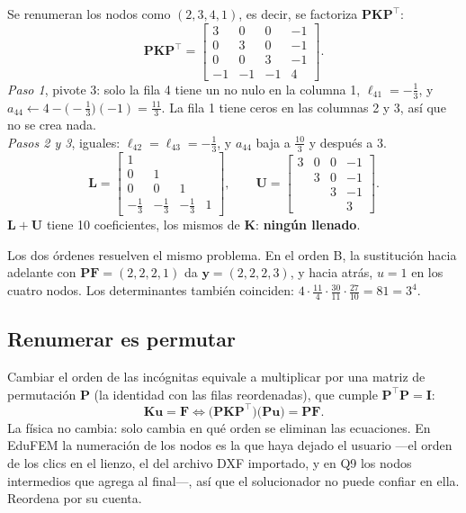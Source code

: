 \documentclass[11pt,a4paper]{article}
\newcommand{\cod}[1]{\texttt{\detokenize{#1}}}
\newcommand{\T}{^{\top}}
\newcommand{\mK}{\bm{K}}
\newcommand{\tf}[2]{\tfrac{#1}{#2}}
\begin{document}
\begin{paso}[title={Orden B: el nodo central al final}]
Se renumeran los nodos como $(2,3,4,1)$, es decir, se factoriza $\bm{P}\mK\bm{P}\T$:
\[
\bm{P}\mK\bm{P}\T=\begin{bmatrix}3&0&0&-1\\0&3&0&-1\\0&0&3&-1\\-1&-1&-1&4\end{bmatrix}.
\]
\emph{Paso 1}, pivote $3$: solo la fila 4 tiene un no nulo en la columna 1, $\ell_{41}=-\tf13$, y $a_{44}\leftarrow4-\bigl(-\tf13\bigr)(-1)=\tf{11}3$. La fila 1 tiene ceros en las columnas 2 y 3, así que no se crea nada.\\
\emph{Pasos 2 y 3}, iguales: $\ell_{42}=\ell_{43}=-\tf13$, y $a_{44}$ baja a $\tf{10}3$ y después a $3$.
\[
\bm{L}=\begin{bmatrix}1&&&\\0&1&&\\0&0&1&\\-\tf13&-\tf13&-\tf13&1\end{bmatrix},\qquad
\bm{U}=\begin{bmatrix}3&0&0&-1\\&3&0&-1\\&&3&-1\\&&&3\end{bmatrix}.
\]
$\bm{L}+\bm{U}$ tiene 10 coeficientes, los mismos de $\mK$: \textbf{ningún llenado}.
\end{paso}

Los dos órdenes resuelven el mismo problema. En el orden B, la sustitución hacia adelante con $\bm{P}\bm{F}=(2,2,2,1)$ da $\bm{y}=(2,2,2,3)$, y hacia atrás, $u=1$ en los cuatro nodos. Los determinantes también coinciden: $4\cdot\tf{11}4\cdot\tf{30}{11}\cdot\tf{27}{10}=81=3^4$.

\subsection{Renumerar es permutar}

Cambiar el orden de las incógnitas equivale a multiplicar por una matriz de permutación $\bm{P}$ (la identidad con las filas reordenadas), que cumple $\bm{P}\T\bm{P}=\bm{I}$:
\begin{equation}\label{eq:permutacion}
\mK\bm{u}=\bm{F}\iff\bigl(\bm{P}\mK\bm{P}\T\bigr)\bigl(\bm{P}\bm{u}\bigr)=\bm{P}\bm{F}.
\end{equation}
La física no cambia: solo cambia en qué orden se eliminan las ecuaciones. En EduFEM la numeración de los nodos es la que haya dejado el usuario ---el orden de los clics en el lienzo, el del archivo DXF importado, y en Q9 los nodos intermedios que \cod{expand_q4_to_q9} agrega al final---, así que el solucionador no puede confiar en ella. Reordena por su cuenta.
\end{document}
